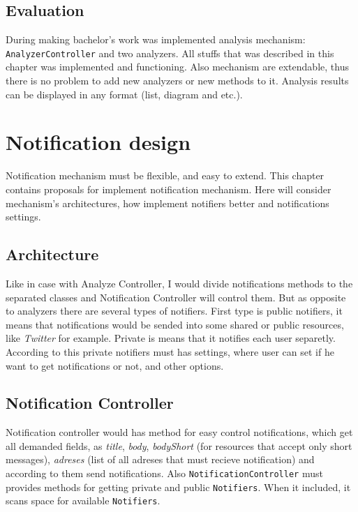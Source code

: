 \section{Evaluation}

During making bachelor's work was implemented analysis mechanism: \texttt{AnalyzerController} and two analyzers. All stuffs that was described in this chapter was implemented and functioning. Also mechanism are extendable, thus there is no problem to add new analyzers or new methods to it. Analysis results can be displayed in any format (list, diagram and etc.).

\chapter{Notification design}
\label{ch:notification_proposal}

Notification mechanism must be flexible, and easy to extend. This chapter contains proposals for implement notification mechanism. Here will consider mechanism's architectures, how implement notifiers better and notifications settings. 

\section{Architecture}

Like in case with Analyze Controller, I would divide notifications methods to the separated classes and Notification Controller will control them. But as opposite to analyzers there are several types of notifiers. First type is public notifiers, it means that notifications would be sended into some shared or public resources, like \emph{Twitter} for example. Private is means that it notifies each user separetly. According to this private notifiers must has settings, where user can set if he want to get notifications or not, and other options.

\section{Notification Controller}

Notification controller would has method for easy control notifications, which get all demanded fields, as \emph{title}, \emph{body}, \emph{bodyShort} (for resources that accept only short messages), \emph{adreses} (list of all adreses that must recieve notification) and according to them send notifications. Also \texttt{NotificationController} must provides methods for getting private and public \texttt{Notifiers}. When it included, it scans space for available \texttt{Notifiers}.

